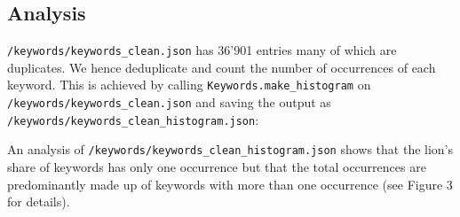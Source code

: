 \hypertarget{analysis-1}{%
\subsection{Analysis}\label{analysis-1}}

\texttt{/keywords/keywords\_clean.json} has 36'901 entries many of which
are duplicates. We hence deduplicate and count the number of occurrences
of each keyword. This is achieved by calling
\texttt{Keywords.make\_histogram} on
\texttt{/keywords/keywords\_clean.json} and saving the output as
\texttt{/keywords/keywords\_clean\_histogram.json}:

\begin{Shaded}
\begin{Highlighting}[]
\OperatorTok{=}\NormalTok{)}
\OperatorTok{=}
\NormalTok{)}
\end{Highlighting}
\end{Shaded}

An analysis of \texttt{/keywords/keywords\_clean\_histogram.json} shows
that the lion's share of keywords has only one occurrence but that the
total occurrences are predominantly made up of keywords with more than
one occurrence (see Figure 3 for details).

